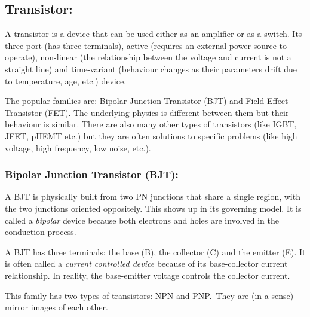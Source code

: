 \subsection{Transistor:}

A transistor is a device that can be used either as an amplifier or
as a switch. Its three-port (has three terminals), active (requires
an external power source to operate), non-linear (the relationship
between the voltage and current is not a straight line) and
time-variant (behaviour changes as their parameters drift due to
temperature, age, etc.) device.

The popular families are: Bipolar Junction Transistor (BJT)
and Field Effect Transistor (FET). The underlying physics is different
between them but their behaviour is similar. There are also many
other types of transistors (like IGBT, JFET, pHEMT etc.) but they are
often solutions to specific problems (like high voltage, high frequency,
low noise, etc.).

\subsubsection{Bipolar Junction Transistor (BJT):}

A BJT is physically built from two PN junctions that share a single
region, with the two junctions oriented oppositely. This shows up in
its governing model. It is called a \emph{bipolar} device because
both electrons and holes are involved in the conduction process.

A BJT has three terminals: the base (B), the collector (C) and the
emitter (E). It is often called a \emph{current controlled device}
because of its base-collector current relationship. In reality, the
base-emitter voltage controls the collector current.

This family has two types of transistors: NPN and PNP.\ They are
(in a sense) mirror images of each other.

